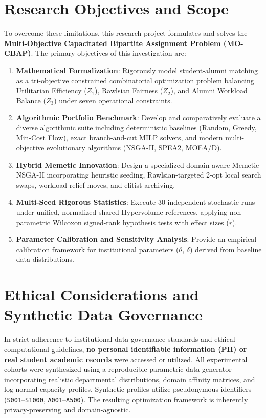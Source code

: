 \section{Research Objectives and Scope}
To overcome these limitations, this research project formulates and solves the \textbf{Multi-Objective Capacitated Bipartite Assignment Problem (MO-CBAP)}. The primary objectives of this investigation are:
\begin{enumerate}
    \item \textbf{Mathematical Formalization}: Rigorously model student-alumni matching as a tri-objective constrained combinatorial optimization problem balancing Utilitarian Efficiency ($Z_1$), Rawlsian Fairness ($Z_2$), and Alumni Workload Balance ($Z_3$) under seven operational constraints.
    \item \textbf{Algorithmic Portfolio Benchmark}: Develop and comparatively evaluate a diverse algorithmic suite including deterministic baselines (Random, Greedy, Min-Cost Flow), exact branch-and-cut MILP solvers, and modern multi-objective evolutionary algorithms (NSGA-II, SPEA2, MOEA/D).
    \item \textbf{Hybrid Memetic Innovation}: Design a specialized domain-aware Memetic NSGA-II incorporating heuristic seeding, Rawlsian-targeted 2-opt local search swaps, workload relief moves, and elitist archiving.
    \item \textbf{Multi-Seed Rigorous Statistics}: Execute 30 independent stochastic runs under unified, normalized shared Hypervolume references, applying non-parametric Wilcoxon signed-rank hypothesis tests with effect sizes ($r$).
    \item \textbf{Parameter Calibration and Sensitivity Analysis}: Provide an empirical calibration framework for institutional parameters ($\theta$, $\delta$) derived from baseline data distributions.
\end{enumerate}

\section{Ethical Considerations and Synthetic Data Governance}
In strict adherence to institutional data governance standards and ethical computational guidelines, \textbf{no personal identifiable information (PII) or real student academic records} were accessed or utilized. All experimental cohorts were synthesized using a reproducible parametric data generator incorporating realistic departmental distributions, domain affinity matrices, and log-normal capacity profiles. Synthetic profiles utilize pseudonymous identifiers (\texttt{S001}--\texttt{S1000}, \texttt{A001}--\texttt{A500}). The resulting optimization framework is inherently privacy-preserving and domain-agnostic.

